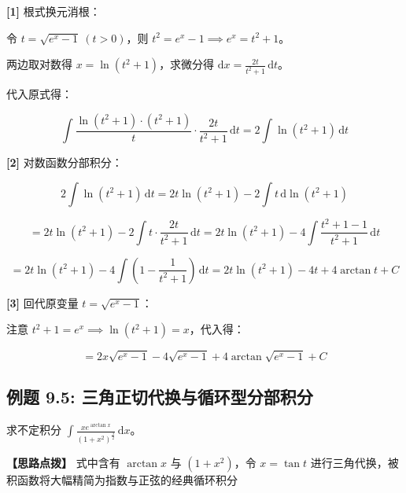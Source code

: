 \documentclass[11pt,a4paper,UTF8]{ctexart}
\begin{document}
\begin{solbox}[分步推导与答题规范]
\textbf{[1]} 根式换元消根：

令 $t = \sqrt{e^x-1} \ (t > 0)$，则 $t^2 = e^x - 1 \implies e^x = t^2 + 1$。

两边取对数得 $x = \ln(t^2+1)$，求微分得 $\mathrm{d}x = \frac{2t}{t^2+1}\,\mathrm{d}t$。

代入原式得：


\begin{equation*}
\int \frac{\ln(t^2+1)\cdot(t^2+1)}{t} \cdot \frac{2t}{t^2+1}\,\mathrm{d}t = 2\int \ln(t^2+1)\,\mathrm{d}t
\end{equation*}


\textbf{[2]} 对数函数分部积分：


\begin{equation*}
2\int \ln(t^2+1)\,\mathrm{d}t = 2t\ln(t^2+1) - 2\int t\,\mathrm{d}\ln(t^2+1)
\end{equation*}



\begin{equation*}
= 2t\ln(t^2+1) - 2\int t \cdot \frac{2t}{t^2+1}\,\mathrm{d}t = 2t\ln(t^2+1) - 4\int \frac{t^2+1-1}{t^2+1}\,\mathrm{d}t
\end{equation*}



\begin{equation*}
= 2t\ln(t^2+1) - 4\int \left(1 - \frac{1}{t^2+1}\right)\,\mathrm{d}t = 2t\ln(t^2+1) - 4t + 4\arctan t + C
\end{equation*}


\textbf{[3]} 回代原变量 $t = \sqrt{e^x-1}$：

注意 $t^2+1 = e^x \implies \ln(t^2+1) = x$，代入得：


\begin{equation*}
= 2x\sqrt{e^x-1} - 4\sqrt{e^x-1} + 4\arctan\sqrt{e^x-1} + C
\end{equation*}

\end{solbox}


\subsection{例题 9.5: 三角正切代换与循环型分部积分}

求不定积分 $\int \frac{xe^{\arctan x}}{(1+x^2)^{\frac{3}{2}}}\,\mathrm{d}x$。

\textbf{\color{DeepPurple}【思路点拨】} 式中含有 $\arctan x$ 与 $(1+x^2)$，令 $x = \tan t$ 进行三角代换，被积函数将大幅精简为指数与正弦的经典循环积分
\end{document}
